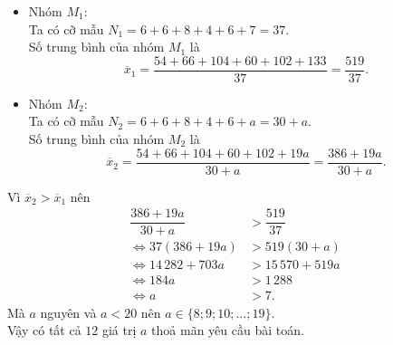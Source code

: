 \begin{ex}
{\begin{center}
\begin{tabular}{|c|c|c|c|c|c|c|}
				\hline
			\end{tabular}
		\end{center}
		\begin{itemize}
			\item Nhóm $M_1$:\\
			Ta có cỡ mẫu $N_1=6+6+8+4+6+7=37$.\\
			Số trung bình của nhóm $M_1$ là \[\overline{x}_1=\dfrac{54+66+104+60+102+133}{37}=\dfrac{519}{37}.\]
			\item Nhóm $M_2$:\\
			Ta có cỡ mẫu $N_2=6+6+8+4+6+a=30+a$.\\
			Số trung bình của nhóm $M_2$ là \[\overline{x}_2=\dfrac{54+66+104+60+102+19a}{30+a}=\dfrac{386+19a}{30+a}.\]
		\end{itemize}
		Vì $\overline{x}_2 > \overline{x}_1$ nên
		\begin{align*}
			\dfrac{386+19a}{30+a} &> \dfrac{519}{37}\\
			\Leftrightarrow 37(386+19a) &> 519(30+a)\\
			\Leftrightarrow 14\,282 + 703a &> 15\,570 + 519a\\
			\Leftrightarrow 184a &> 1\,288\\
			\Leftrightarrow a &> 7.
		\end{align*}
		Mà $a$ nguyên và $a < 20$ nên $a \in \{8; 9; 10; \dots; 19\}$.\\
		Vậy có tất cả $12$ giá trị $a$ thoả mãn yêu cầu bài toán.
	}
\end{ex}

